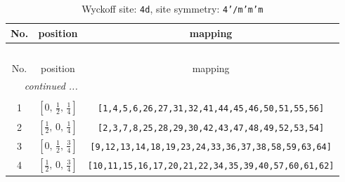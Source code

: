 \documentclass[fleqn,8pt]{jsarticle}
\begin{document}
\renewcommand{\arraystretch}{1.2}
\begin{longtable}{ccc}
\caption{Wyckoff site: {\tt 4d}, site symmetry: {\tt 4'/m'm'm}}
 \\
 \hline \hline
No. & position & mapping \\ \hline \endfirsthead

\multicolumn{2}{l}{\tablename\ \thetable{}} \\
 \hline \hline
No. & position & mapping \\ \hline \endhead

 \hline \hline
\multicolumn{2}{r}{\footnotesize\it continued ...} \\ \endfoot

 \hline \hline
\multicolumn{2}{r}{} \\ \endlastfoot

1 & $\left[ 0,\, \frac{1}{2},\, \frac{1}{4} \right]$ & {\tt [1,4,5,6,26,27,31,32,41,44,45,46,50,51,55,56]} \\ \hline
2 & $\left[ \frac{1}{2},\, 0,\, \frac{1}{4} \right]$ & {\tt [2,3,7,8,25,28,29,30,42,43,47,48,49,52,53,54]} \\ \hline
3 & $\left[ 0,\, \frac{1}{2},\, \frac{3}{4} \right]$ & {\tt [9,12,13,14,18,19,23,24,33,36,37,38,58,59,63,64]} \\ \hline
4 & $\left[ \frac{1}{2},\, 0,\, \frac{3}{4} \right]$ & {\tt [10,11,15,16,17,20,21,22,34,35,39,40,57,60,61,62]} \\
\end{longtable}
\renewcommand{\arraystretch}{1.2}
\end{document}
